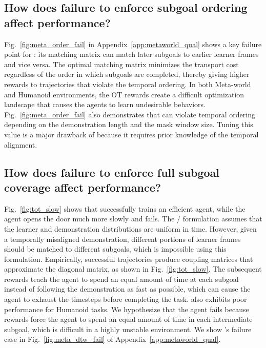 \subsection{How does failure to enforce subgoal ordering affect performance?}
Fig.~\ref{fig:meta_order_fail} in Appendix~\ref{app:metaworld_qual} shows a key failure point for \ot{}: its matching matrix can match later subgoals to earlier learner frames and vice versa.
The optimal matching matrix minimizes the transport cost regardless of the order in which subgoals are completed, thereby giving higher \ot{} rewards to trajectories that violate the temporal ordering. In both Meta-world and Humanoid environments, the OT rewards create a difficult optimization landscape that causes the agents to learn undesirable behaviors. 
Fig.~\ref{fig:meta_order_fail} also demonstrates that \tot{} can violate temporal ordering depending on the demonstration length and the mask window size. 
Tuning this value is a major drawback of \tot{} because it requires prior knowledge of the temporal alignment.




\subsection{How does failure to enforce full subgoal coverage affect performance? \label{exp:progress}}
Fig.~\ref{fig:tot_slow} shows that \orca{} successfully trains an efficient agent, while the \tot{} agent opens the door much more slowly and fails. 
The \ot{}/\tot{} formulation assumes that the learner and demonstration distributions are uniform in time. 
However, given a temporally misaligned demonstration, different portions of learner frames should be matched to different subgoals, which is impossible using this formulation.
Empirically, successful trajectories produce coupling matrices that approximate the diagonal matrix, as shown in Fig.~\ref{fig:tot_slow}. 
The subsequent rewards teach the agent to spend an equal amount of time at each subgoal instead of following the demonstration as fast as possible, which can cause the agent to exhaust the timesteps before completing the task. 
\tot{} also exhibits poor performance for Humanoid tasks. We hypothesize that the agent fails because \tot{} rewards force the agent to spend an equal amount of time in each intermediate subgoal, which is difficult in a highly unstable environment. 
We show \dtw{}'s failure case in Fig.~\ref{fig:meta_dtw_fail} of Appendix~\ref{app:metaworld_qual}.


